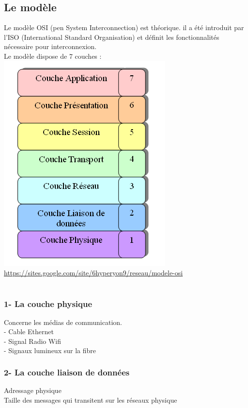 \documentclass{article}
\begin{document}
\subsection{Le modèle}
Le modèle OSI (pen System Interconnection) est théorique. il a été introduit par l’ISO (International Standard Organisation) et définit les fonctionnalités nécessaire pour interconnexion. \\ 
Le modèle dispose de 7 couches : \\
\includegraphics{modeleOSI.PNG} \\
\url{https://sites.google.com/site/6hyperyon9/reseau/modele-osi}
\\
\\
\subsubsection*{1- La couche physique}
Concerne les médias de communication. \\ 
- Cable Ethernet \\
- Signal Radio Wifi \\
- Signaux lumineux sur la fibre \\
\subsubsection*{2- La couche liaison de données}
Adressage physique \\
Taille des messages qui transitent sur les réseaux physique \\
\newpage 
\end{document}
